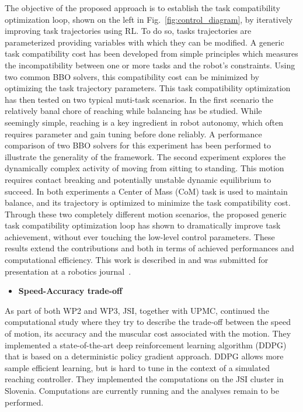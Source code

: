 The objective of the proposed approach is to establish the task compatibility optimization loop, shown on the left in Fig.~\ref{fig:control_diagram}, by iteratively improving task trajectories using RL. To do so, tasks trajectories are parameterized providing variables with which they can be modified. A generic task compatibility cost has been developed from simple principles which measures the incompatibility between one or more tasks and the robot's constraints. Using two common BBO solvers, this compatibility cost can be minimized by optimizing the task trajectory parameters. This task compatibility optimization has then tested on two typical muti-task scenarios. In the first scenario the relatively banal chore of reaching while balancing has be studied. While seemingly simple, reaching is a key ingredient in robot autonomy, which often requires parameter and gain tuning before done reliably. A performance comparison of two BBO solvers for this experiment has been performed to illustrate the generality of the framework. The second experiment explores the dynamically complex activity of moving from sitting to standing. This motion requires contact breaking and potentially unstable dynamic equilibrium to succeed. In both experiments a Center of Mass (CoM) task is used to maintain balance, and its trajectory is optimized to minimize the task compatibility cost. Through these two completely different motion scenarios, the proposed generic task compatibility optimization loop has shown to dramatically improve task achievement, without ever touching the low-level control parameters. These results extend the contributions \cite{lober-HUMANOIDS2014} and \cite{lober_IROS2015} both in terms of achieved performances and computational efficiency. This work is described in \cite{deliverable33} and was submitted for presentation at a robotics journal~\cite{lober2017RAL-IROS}.

\begin{itemize}
\item \textbf{Speed-Accuracy trade-off}
\end{itemize}
As part of both WP2 and WP3, JSI, together with UPMC, continued the computational study where they try to describe the trade-off between the speed of motion, its accuracy and the muscular cost associated with the motion. They implemented a state-of-the-art deep reinforcement learning algorithm (DDPG) that is based on a deterministic policy gradient approach. DDPG allows more sample efficient learning, but is hard to tune in the context of a simulated reaching controller. They implemented the computations on the JSI cluster in Slovenia. Computations are currently running and the analyses remain to be performed.
    
